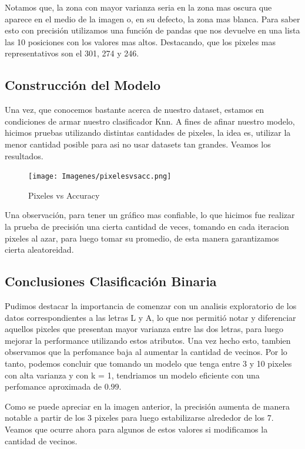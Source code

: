 \documentclass[10pt,a4paper]{article}
\begin{document}
Notamos que, la zona con mayor varianza seria en la zona mas oscura que aparece en el medio de la imagen o, en su defecto, la zona mas blanca. Para saber esto con precisión utilizamos una función de pandas que nos devuelve en una lista las 10 posiciones con los valores mas altos. Destacando, que los pixeles
mas representativos son el 301, 274 y 246. 

\subsection{Construcción del Modelo} \vspace{0.1cm}

Una vez, que conocemos bastante acerca de nuestro dataset, estamos en condiciones de armar nuestro clasificador Knn. A fines de afinar nuestro modelo, hicimos pruebas utilizando distintas cantidades de pixeles, la idea es, utilizar la menor cantidad posible para asi no usar datasets tan grandes. Veamos los resultados.

\begin{figure}[h]
  \centering
  \texttt{[image: Imagenes/pixelesvsacc.png]}
  \caption{Pixeles vs Accuracy}
  \label{fig:Tabla 1}
\end{figure}

Una observación, para tener un gráfico mas confiable, lo que hicimos fue realizar la prueba de precisión una cierta cantidad de veces, tomando en cada iteracion pixeles al azar, para luego tomar su promedio, de esta manera garantizamos cierta aleatoreidad.

\subsection{Conclusiones Clasificación Binaria}

Pudimos destacar la importancia de comenzar con un analisis exploratorio de los datos correspondientes a las letras L y A, lo que nos permitió notar y diferenciar aquellos pixeles que presentan mayor varianza entre las dos letras, para luego mejorar la performance utilizando estos atributos. Una vez hecho esto, tambien observamos que la perfomance baja al aumentar la cantidad de vecinos. Por lo tanto, podemos concluir que tomando un modelo que tenga entre 3 y 10 pixeles con alta varianza y con k = 1, tendriamos un modelo eficiente con una perfomance aproximada de $0.99$. 

\newpage

Como se puede apreciar en la imagen anterior, la precisión aumenta de manera notable a partir de los 3 pixeles para luego estabilizarse alrededor de los 7.
Veamos que ocurre ahora para algunos de estos valores si modificamos la cantidad de vecinos.
\end{document}
